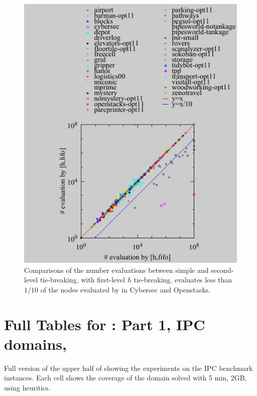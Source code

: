 \documentclass[10pt,letterpaper]{article}
\begin{document}
\begin{figure}[htb]
 \centering {}
 \includegraphics{tables/aaai16-30min-5min-cut/aaai16prelim3/evaluated-lmcut_ff-lmcut_lf.pdf}
 \caption{Comparisons of the number evaluations between simple \lifo and
 \fifo second-level tie-breaking, with first-level $h$
 tie-breaking. \lifo evaluates less than $1/10$ of the nodes evaluated
 by \fifo in Cybersec and Openstacks.}
 \label{f-h-eval-full}
\end{figure}

\clearpage
\onecolumn
\section{Full Tables for  : Part 1, IPC domains, \lmcut}

\begin{table}[htb]
 {
 \centering
 
 \caption{
 Full version of the upper half of  showing 
 the experiments on the IPC benchmark instances.
 Each cell shows the coverage of the domain solved with 5 min, 2GB,
 using \lmcut heuritics.
 }
 \label{lmcut-ipc-full}
 }
\end{table}
\end{document}
